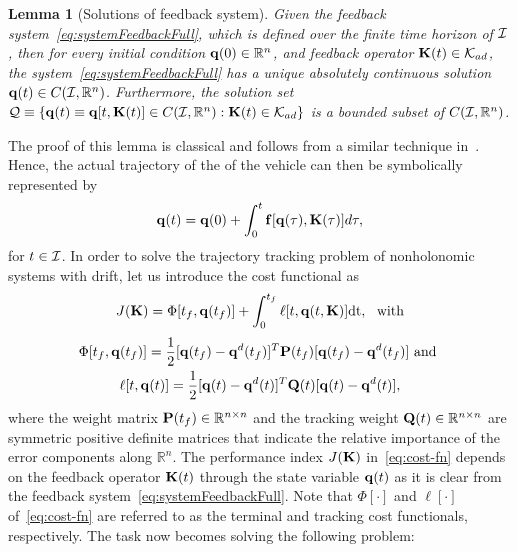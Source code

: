 \documentclass[
12pt,draftcls,onecolumn%
]{IEEEtran}
\newtheorem{lemma}{Lemma}
\begin{document}
\begin{lemma}[Solutions of feedback system]
\label{lem:feedback-sol}
Given the feedback system~\eqref{eq:systemFeedbackFull}, which is defined over the finite time horizon of ${\cal I}$, then for every initial condition ${\bf q}(0)\in\mathbb{R}^n$, and feedback operator ${\bf K}(t)\in {\cal K}_{ad}$, the system~\eqref{eq:systemFeedbackFull} has a unique absolutely continuous solution ${\bf q}(t)\in C({\cal I}, \mathbb{R}^n)$. Furthermore, the solution set ${\cal Q}\equiv\left\{{\bf q}(t) \equiv{\bf q}[t,{\bf K}(t)]\in C({\cal I},\mathbb{R}^n):{\bf K}(t)\in {\cal K}_{ad}\right \}$ is a bounded subset of $C({\cal I}, \mathbb{R}^n)$. 
\end{lemma}
The proof of this lemma is classical and follows from a similar technique in~\cite[page~89]{Ahmed2006}. %
Hence, the actual trajectory of the of the vehicle can then be symbolically represented by 
\begin{equation}
{\bf q}(t) = {\bf q}(0) + \int_{0}^{t}{\bf f}[{\bf q}(\tau),{\bf K}(\tau)]d\tau,
\label{eq:actual-trajectory-full} 
\end{equation}
for $t\in {\cal I}$. In order to solve the trajectory tracking problem of nonholonomic systems with drift, let us introduce the cost functional as
\begin{equation}
J({\bf K}) = \Phi [t_f,{\bf q}(t_f)] + \int_{0}^{t_f} \ell [t,{\bf q}(t,{\bf K})]\mathrm{dt},~~\mathrm{with}
\label{eq:cost-fn}
\end{equation}
\begin{multline*}
\Phi [t_f,{\bf q}(t_f)]= \frac{1}{2} [{\bf q}(t_f)-{\bf q}^d(t_f)]^T{\bf P}(t_f)[{\bf q}(t_f)-{\bf q}^d(t_f)] ~\mathrm{and}~\\
\ell [t,{\bf q}(t)] =\frac{1}{2}[{\bf q}(t)-{\bf q}^d(t)]^T{\bf Q}(t)[{\bf q}(t)-{\bf q}^d(t)],
\end{multline*}
where the weight matrix ${\bf P}(t_f) \in\mathbb{R}^{n\times n}$ and the  tracking weight ${\bf Q}(t)\in\mathbb{R}^{n\times n}$ are symmetric positive definite matrices that indicate the relative importance of the error components along $\mathbb{R}^n.$ %
%
%
The performance index $J({\bf K})$ in~\eqref{eq:cost-fn} depends on the feedback operator ${\bf K}(t)$ through the state variable ${\bf q}(t)$ as it is clear from the feedback system~\eqref{eq:systemFeedbackFull}. Note that $\Phi[\cdot]$ and $\ell[\cdot]$ of~\eqref{eq:cost-fn} are referred to as the terminal and tracking cost functionals, respectively. The task now becomes solving the following problem:
\end{document}
